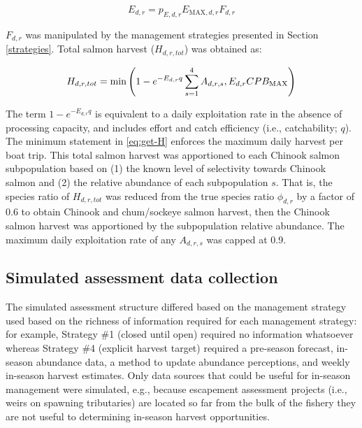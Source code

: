 \documentclass[12pt,]{book}
\theoremstyle{definition}
\theoremstyle{definition}
\theoremstyle{definition}
\theoremstyle{remark}
\begin{document}
\begin{equation}
  E_{d,r} = p_{E,d,r} E_{\text{MAX},d,r} F_{d,r}
  \label{eq:get-E}
\end{equation}

\noindent
\(F_{d,r}\) was manipulated by the management strategies presented in
Section \ref{strategies}. Total salmon harvest (\(H_{d,r,tot}\)) was
obtained as:

\begin{equation}
  H_{d,r,tot}=\text{min} \left(1 - e^{-E_{d,r} q} \sum_{s=1}^4 A_{d,r,s}, \space E_{d,r} CPB_{\text{MAX}} \right)
  \label{eq:get-H}
\end{equation}

\noindent
The term \(1 - e^{-E_{d,r} q}\) is equivalent to a daily exploitation
rate in the absence of processing capacity, and includes effort and
catch efficiency (i.e., catchability; \(q\)). The minimum statement in
\eqref{eq:get-H} enforces the maximum daily harvest per boat trip. This
total salmon harvest was apportioned to each Chinook salmon
subpopulation based on (1) the known level of selectivity towards
Chinook salmon and (2) the relative abundance of each subpopulation
\(s\). That is, the species ratio of \(H_{d,r,tot}\) was reduced from
the true species ratio \(\phi_{d,r}\) by a factor of 0.6 to obtain
Chinook and chum/sockeye salmon harvest, then the Chinook salmon harvest
was apportioned by the subpopulation relative abundance. The maximum
daily exploitation rate of any \(A_{d,r,s}\) was capped at 0.9.

\subsection{Simulated assessment data
collection}\label{simulated-assessment-data-collection}

\noindent
The simulated assessment structure differed based on the management
strategy used based on the richness of information required for each
management strategy: for example, Strategy \#1 (closed until open)
required no information whatsoever whereas Strategy \#4 (explicit
harvest target) required a pre-season forecast, in-season abundance
data, a method to update abundance perceptions, and weekly in-season
harvest estimates. Only data sources that could be useful for in-season
management were simulated, e.g., because escapement assessment projects
(i.e., weirs on spawning tributaries) are located so far from the bulk
of the fishery they are not useful to determining in-season harvest
opportunities.
\end{document}
